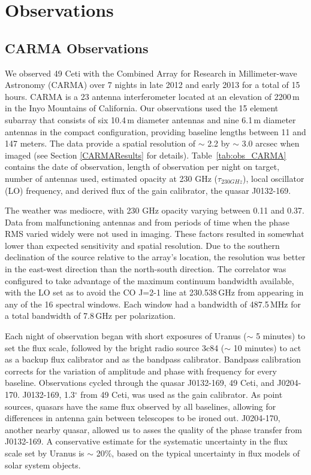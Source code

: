 \chapter{Observations}
\label{chap2}

\section{CARMA Observations}
\label{CARMA Observations}
We observed 49 Ceti with the Combined Array for Research in Millimeter-wave Astronomy (CARMA) over 7 nights in late 2012 and early 2013 for a total of 15 hours. CARMA is a 23 antenna interferometer located at an elevation of 2200\,m in the Inyo Mountains of California. Our observations used the 15 element subarray that consists of six 10.4\,m diameter antennas and nine 6.1\,m diameter antennas in the compact configuration, providing baseline lengths between 11 and 147 meters. The data provide a spatial resolution of $\sim$ 2.2 by $\sim$ 3.0 arcsec when imaged (see Section \ref{CARMAResults} for details). Table~\ref{tab:obs_CARMA} contains the date of observation, length of observation per night on target, number of antennas used, estimated opacity at 230 GHz ($\tau_{230GHz}$), local oscillator (LO) frequency, and derived flux of the gain calibrator, the quasar J0132-169. 

The weather was mediocre, with 230 GHz opacity varying between 0.11 and 0.37. Data from malfunctioning antennas and from periods of time when the phase RMS varied widely were not used in imaging. These factors resulted in somewhat lower than expected sensitivity and spatial resolution. Due to the southern declination of the source relative to the array's location, the resolution was better in the east-west direction than the north-south direction. The correlator was configured to take advantage of the maximum continuum bandwidth available, with the LO set as to avoid the CO J=2-1 line at 230.538\,GHz from appearing in any of the 16 spectral windows. Each window had a bandwidth of 487.5\,MHz for a total bandwidth of 7.8\,GHz per polarization. 

Each night of observation began with short exposures of Uranus ($\sim$ 5 minutes) to set the flux scale, followed by the bright radio source 3c84 ($\sim$ 10 minutes) to act as a backup flux calibrator and as the bandpass calibrator. Bandpass calibration corrects for the variation of amplitude and phase with frequency for every baseline. Observations cycled through the quasar J0132-169, 49 Ceti, and J0204-170. J0132-169, 1.3$^{\circ}$ from 49 Ceti, was used as the gain calibrator. As point sources, quasars have the same flux observed by all baselines, allowing for differences in antenna gain between telescopes to be ironed out. J0204-170, another nearby quasar, allowed us to asses the quality of the phase transfer from J0132-169. A conservative estimate for the systematic uncertainty in the flux scale set by Uranus is $\sim$ 20\%, based on the typical uncertainty in flux models of solar system objects.

